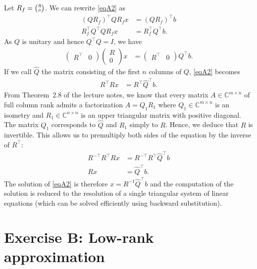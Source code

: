 \documentclass[11pt]{article}
\newcommand{\complex}{\mathbb{C}} %
\begin{document}
Let $\tiny{R_f=\begin{pmatrix}R\\0\end{pmatrix}}$.
We can rewrite \eqref{eqA2} as
\begin{align*}
    (QR_f)^\top QR_fx &= (QR_f)^\top b\\
    R_f^\top Q^\top QR_fx &= R_f^\top Q^\top b.
\end{align*}
As \(Q\) is unitary and hence $Q^\top Q=I$, we have
\begin{align*}
    \begin{pmatrix}
    R^\top & 0
    \end{pmatrix}
    \begin{pmatrix}
    R\\ 0
    \end{pmatrix}x
    &=\begin{pmatrix}
    R^\top & 0
    \end{pmatrix}
    Q^\top b.
\end{align*}
If we call $\hat{Q}$ the matrix consisting of the first \(n\) columns of \(Q\), \eqref{eqA2} becomes
\begin{align*}
    R^\top Rx &= R^\top \hat{Q}^\top b.
\end{align*}
From Theorem~2.8 of the lecture notes, we know that every matrix $A\in\complex^{m\times n}$ of full column rank admits a factorization $A=Q_1R_1$ where $Q_1\in\complex^{m\times n}$ is an isometry and $R_1\in\complex^{n\times n}$ is an upper triangular matrix with positive diagonal.
The matrix $Q_1$ corresponds to $\hat{Q}$ and $R_1$ simply to $R$. Hence, we deduce that $R$ is invertible. This allows us to premultiply both sides of the equation by the inverse of $R^\top$:
\begin{align*}
    R^{-\top}R^\top Rx &= R^{-\top}R^\top \hat{Q}^\top b\\
    Rx &= \hat{Q}^\top b.
\end{align*}
The solution of \eqref{eqA2} is therefore $x=R^{-1}\hat{Q}^\top b$ and the computation of the solution is reduced to the resolution of a single triangular system of linear equations (which can be solved efficiently using backward substitution).


\section*{Exercise B: Low-rank approximation}
\end{document}
